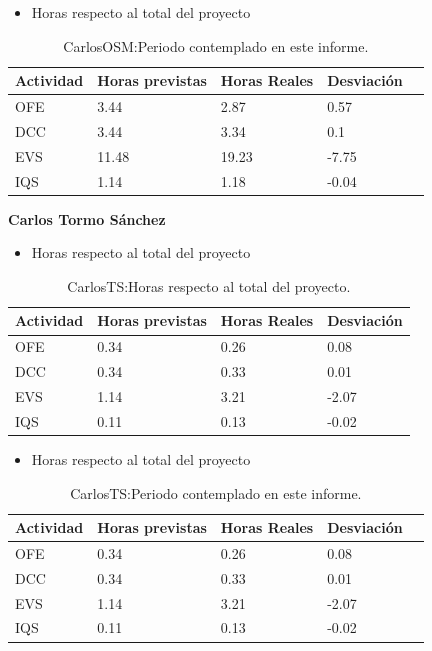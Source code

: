 \begin{itemize}
\item Horas respecto al total del proyecto
\end{itemize}
\begin{table}[H]
\begin{center}
\begin{tabular}{ l l l l l }
  Actividad & Horas previstas & Horas Reales & Desviación \\ \hline \hline
    OFE & 3.44 & 2.87 & 0.57 \\ \hline
    DCC & 3.44 & 3.34 & 0.1 \\ \hline
    EVS & 11.48 & 19.23 & -7.75 \\ \hline
    IQS & 1.14 & 1.18 & -0.04 \\ \hline
\end{tabular}
\caption{CarlosOSM:Periodo contemplado en este informe.}
\label{tab:CarlosOSM:PeriodoContempladoInforme}
\end{center}
\end{table}

\textbf{Carlos Tormo Sánchez}
\begin{itemize}
\item Horas respecto al total del proyecto
\end{itemize}
\begin{table}[H]
\begin{center}
\begin{tabular}{ l l l l }
Actividad & Horas previstas & Horas Reales & Desviación \\ \hline \hline
	OFE & 0.34 & 0.26 & 0.08 \\ \hline
	DCC & 0.34 & 0.33 & 0.01 \\ \hline
	EVS & 1.14 & 3.21 & -2.07\\ \hline
	IQS & 0.11 & 0.13 & -0.02 \\ \hline
\end{tabular}
\caption{CarlosTS:Horas respecto al total del proyecto.}
\label{tab:CarlosTS:HorasTotalInforme}
\end{center}
\end{table}

\newpage

\begin{itemize}
\item Horas respecto al total del proyecto
\end{itemize}
\begin{table}[H]
\begin{center}
\begin{tabular}{ l l l l l }
  Actividad & Horas previstas & Horas Reales & Desviación \\ \hline \hline
  	OFE & 0.34 & 0.26 & 0.08 \\ \hline
  	DCC & 0.34 & 0.33 & 0.01 \\ \hline
  	EVS & 1.14 & 3.21 & -2.07\\ \hline
  	IQS & 0.11 & 0.13 & -0.02 \\ \hline
\end{tabular}
\caption{CarlosTS:Periodo contemplado en este informe.}
\label{tab:CarlosTS:PeriodoContempladoInforme}
\end{center}
\end{table}

